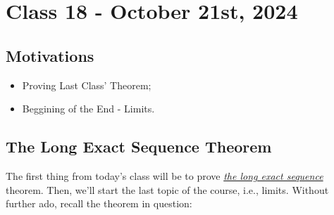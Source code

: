 \documentclass[../category_theory.tex]{subfiles}
\begin{document}
\section{Class 18 - October 21st, 2024}
\subsection{Motivations}
\begin{itemize}
	\item Proving Last Class' Theorem;
	\item Beggining of the End - Limits.
\end{itemize}
\subsection{The Long Exact Sequence Theorem}
The first thing from today's class will be to prove \hyperlink{long_exact_sequence}{\textit{the long exact sequence}} theorem. Then, we'll start the last topic of the course, i.e., limits. Without further ado, recall the theorem in question:
\end{document}
